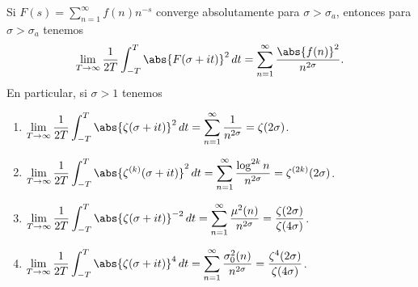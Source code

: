 \documentclass[12pt,a4paper]{book}
\begin{document}
    \begin{teorema}\label{teo:11-16}
        Si $F(s)=\sum_{n=1}^{\infty}f(n)n^{-s}$ converge absolutamente para $\sigma>\sigma_{a}$,
        entonces para $\sigma>\sigma_{a}$ tenemos
        \begin{equation}\label{eq:11-18}
            \lim_{T\to\infty}\frac{1}{2T}\int_{-T}^{T}\abs{F(\sigma+it)}^{2}\,dt=\sum_{n=1}^{\infty}\frac{\abs{f(n)}^{2}}{n^{2\sigma}}.
        \end{equation}
        En particular, si $\sigma>1$ tenemos
        \begin{enumerate}
            \item[(a)] $\displaystyle\lim_{T\to\infty}\frac{1}{2T}\int_{-T}^{T}\abs{\zeta(\sigma+it)}^{2}\,dt=\sum_{n=1}^{\infty}\frac{1}{n^{2\sigma}}=\zeta(2\sigma)$.
            \item[(b)] $\displaystyle\lim_{T\to\infty}\frac{1}{2T}\int_{-T}^{T}\abs{\zeta^{(k)}(\sigma+it)}^{2}\,dt=\sum_{n=1}^{\infty}\frac{\log^{2k}n}{n^{2\sigma}}=\zeta^{(2k)}(2\sigma)$.
            \item[(c)] $\displaystyle\lim_{T\to\infty}\frac{1}{2T}\int_{-T}^{T}\abs{\zeta(\sigma+it)}^{-2}\,dt=\sum_{n=1}^{\infty}\frac{\mu^{2}(n)}{n^{2\sigma}}=\frac{\zeta(2\sigma)}{\zeta(4\sigma)}$.
            \item[(d)] $\displaystyle\lim_{T\to\infty}\frac{1}{2T}\int_{-T}^{T}\abs{\zeta(\sigma+it)}^{4}\,dt=\sum_{n=1}^{\infty}\frac{\sigma_{0}^{2}(n)}{n^{2\sigma}}=\frac{\zeta^{4}(2\sigma)}{\zeta(4\sigma)}$.
        \end{enumerate}
    \end{teorema}
\end{document}
